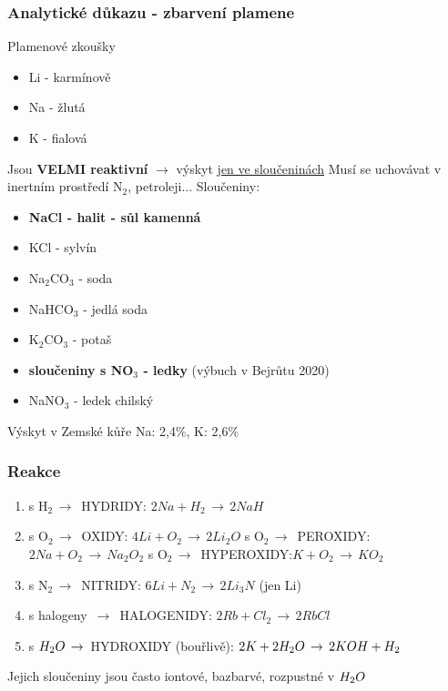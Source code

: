     \subsubsection{Analytické důkazu - zbarvení plamene}
        Plamenové zkoušky
        \begin{itemize}
            \item Li - karmínově
            \item Na - žlutá
            \item K - fialová
        \end{itemize}
    Jsou \textbf{VELMI reaktivní} $\rightarrow$ výskyt \underline{jen ve sloučeninách}
    Musí se uchovávat v inertním prostředí N$_2$, petroleji...
    Sloučeniny:
    \begin{itemize}
        \item \textbf{NaCl - halit - sůl kamenná}
        \item KCl - sylvín
        \item Na$_2$CO$_3$ - soda
        \item NaHCO$_3$ - jedlá soda
        \item K$_2$CO$_3$ - potaš
        \item \textbf{sloučeniny s NO$_3$ - ledky} (výbuch v Bejrůtu 2020)
        \item NaNO$_3$ - ledek chilský
    \end{itemize}
    Výskyt v Zemské kůře Na: 2,4\%, K: 2,6\%
    
    \subsubsection{Reakce}
    \begin{enumerate}
        \item s H$_2\,\to\,$ HYDRIDY: \tab $2Na + H_2\,\to\, 2NaH$
        \item s O$_2\,\to\,$ OXIDY: \tab $4Li + O_2\,\to\, 2Li_2O$
            \newline s O$_2\,\to\,$ PEROXIDY:\tab $2Na + O_2\,\to\, Na_2O_2$
            \newline s O$_2\,\to\,$ HYPEROXIDY:\tab $K + O_2\,\to\, KO_2$
        \item s N$_2\,\to\,$ NITRIDY: \tab $6Li + N_2\,\to\, 2Li_3N$ (jen Li)
        \item s halogeny $\,\to\,$ HALOGENIDY: \tab $2Rb + Cl_2\,\to\, 2RbCl$
        \item s $H_2O \,\to\,$ HYDROXIDY (bouřlivě): \tab $2K + 2H_2O \,\to\, 2KOH + H_2$
    \end{enumerate}
    Jejich sloučeniny jsou často iontové, bazbarvé, rozpustné v $H_2O$

